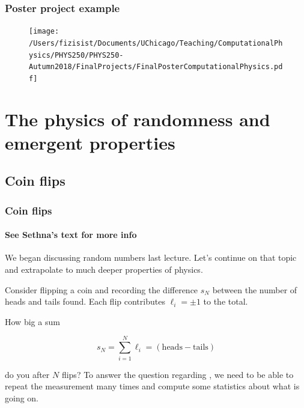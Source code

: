 \documentclass[hyperref={colorlinks=true}]{beamer}
\begin{document}

\begin{frame}%
  \frametitle{Poster project example}
  
  \begin{figure}
    \texttt{[image: /Users/fizisist/Documents/UChicago/Teaching/ComputationalPhysics/PHYS250/PHYS250-Autumn2018/FinalProjects/FinalPosterComputationalPhysics.pdf]}
  \end{figure}
  
\end{frame}

\section[The physics of randomness and emergent properties]{The physics of randomness and emergent properties}

\subsection[Coin flips]{Coin flips}

\begin{frame}%
  \frametitle{Coin flips}
  \framesubtitle{See Sethna's text for more info}
  
  We began discussing random numbers last lecture. Let's continue on that topic and extrapolate to much deeper properties of physics.
  
  \vspace{1cm}
  
  Consider flipping a coin and recording the difference $s_N$ between the number of heads and tails found. Each flip contributes $\ell_i = \pm 1$ to the total. 
  
  How big a sum 
  
  \begin{equation} 
    s_N = \sum_{i=1}^{N} \ell_i = \mathrm{(heads - tails)} 
  \end{equation}
  
  do you  after $N$ flips? To answer the question regarding , we need to be able to repeat the measurement many times and compute some statistics about what is going on.
  
\end{frame}
\end{document}
